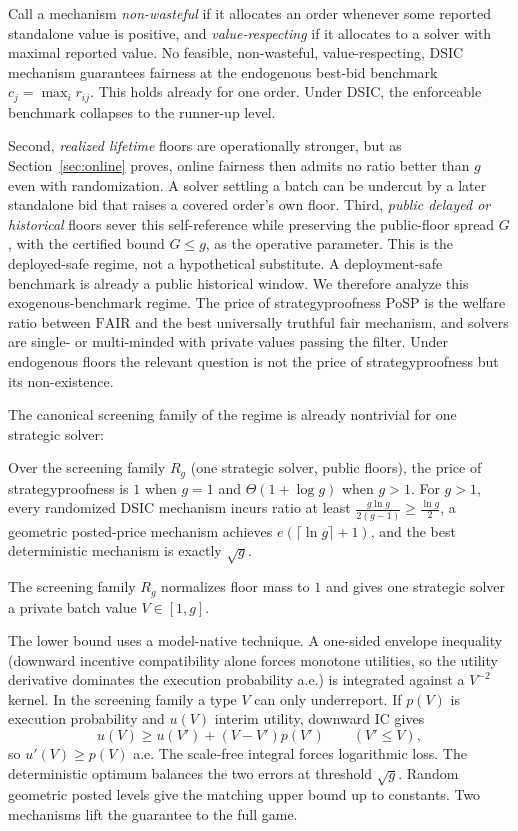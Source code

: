 \documentclass{llncs}
\newcommand{\FAIR}{\mathrm{FAIR}}
\begin{document}
\begin{theorem}
\label{thm:incompat}
Call a mechanism \emph{non-wasteful} if it allocates an order whenever
some reported standalone value is positive, and \emph{value-respecting}
if it allocates to a solver with maximal reported value. No feasible,
non-wasteful, value-respecting, DSIC mechanism guarantees fairness at the
endogenous best-bid benchmark $c_j=\max_i r_{ij}$. This holds already for
one order. Under DSIC, the enforceable benchmark collapses to the
runner-up level.
\end{theorem}

Second, \emph{realized lifetime} floors are operationally stronger, but
as Section~\ref{sec:online} proves, online fairness then admits no ratio
better than $g$ even with randomization. A solver settling a batch can be
undercut by a later standalone bid that raises a covered order's own
floor. Third, \emph{public delayed or historical} floors sever this
self-reference while preserving the public-floor spread $G$, with the
certified bound $G\le g$, as the operative parameter.
This is the deployed-safe regime, not a hypothetical substitute. A
deployment-safe benchmark is already a public historical window. We therefore
analyze this exogenous-benchmark regime. The price of strategyproofness
$\mathrm{PoSP}$ is the welfare ratio between $\FAIR$ and the best
universally truthful fair mechanism, and solvers are single- or
multi-minded with private values passing the filter. Under endogenous
floors the relevant question is not the price of strategyproofness but its
non-existence.

The canonical screening family of the regime is already nontrivial for
one strategic solver:

\begin{theorem}\label{thm:posp}
Over the screening family $R_g$ (one strategic solver, public floors),
the price of strategyproofness is $1$ when $g=1$ and
$\Theta(1+\log g)$ when $g>1$. For $g>1$, every randomized DSIC mechanism
incurs ratio at least $\frac{g\ln g}{2(g-1)}\ge\frac{\ln g}{2}$, a
geometric posted-price mechanism achieves $e(\lceil\ln g\rceil+1)$, and
the best deterministic mechanism is exactly $\sqrt g$.
\end{theorem}

The screening family $R_g$ normalizes floor mass to $1$ and gives one
strategic solver a private batch value $V\in[1,g]$.

The lower bound uses a model-native technique. A one-sided envelope
inequality (downward incentive compatibility alone forces monotone
utilities, so the utility derivative dominates the execution probability
a.e.) is integrated against a $V^{-2}$ kernel. In the screening family a
type $V$ can only underreport. If $p(V)$ is execution probability and
$u(V)$ interim utility, downward IC gives
\[
  u(V)\ge u(V')+(V-V')p(V') \qquad (V'\le V),
\]
so $u'(V)\ge p(V)$ a.e. The scale-free integral forces logarithmic loss.
The deterministic optimum balances the two errors at threshold $\sqrt g$.
Random geometric posted levels give the matching upper bound up to
constants. Two mechanisms lift the guarantee to the full game.
\end{document}

